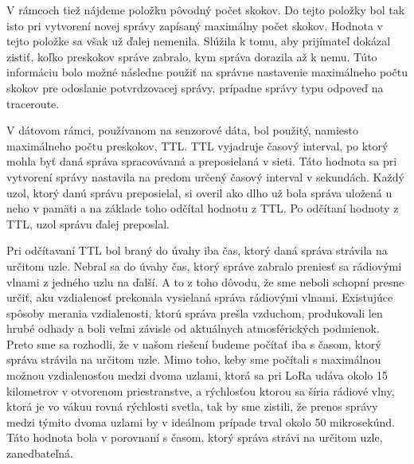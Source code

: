 \documentclass[slovak,master]{diploma}
\begin{document}
V rámcoch tiež nájdeme položku pôvodný počet skokov. Do tejto položky bol tak isto pri vytvorení novej správy zapísaný maximálny počet skokov. Hodnota v tejto položke sa 
však už ďalej nemenila. Slúžila k tomu, aby prijímateľ dokázal zistiť, koľko preskokov správe zabralo, kym správa dorazila až k nemu. Túto informáciu bolo možné 
následne použiť na správne nastavenie maximálneho počtu skokov pre odoslanie potvrdzovacej správy, prípadne správy typu odpoveď na traceroute.

\begin{table}[h!]
  \centering
  \qquad
  \caption{Štruktúra dátového rámcu pre ACK a senzorové správy.}
  \label{tab:frames}
\end{table}

V dátovom rámci, používanom na senzorové dáta, bol použitý, namiesto maximálneho počtu preskokov, TTL. TTL vyjadruje časový interval, po ktorý mohla byť daná správa 
spracovávaná a preposielaná v sieti. Táto hodnota sa pri vytvorení správy nastavila na predom určený časový interval v sekundách. Každý uzol, ktorý danú správu preposielal, 
si overil ako dlho už bola správa uložená u neho v pamäti a na základe toho odčítal hodnotu z TTL. Po odčítaní hodnoty z TTL, uzol správu ďalej preposlal.

Pri odčítavaní TTL bol braný do úvahy iba čas, ktorý daná správa strávila na určitom uzle. Nebral sa do úvahy čas, ktorý správe zabralo preniesť sa rádiovými vlnami z jedného uzlu 
na ďalší. A to z toho dôvodu, že sme neboli schopní presne určiť, aku vzdialenosť prekonala vysielaná správa rádiovými vlnami. Existujúce spôsoby merania vzdialenosti, 
ktorú správa prešla vzduchom, produkovali len hrubé odhady a boli veľmi závisle od aktuálnych atmosférických podmienok. Preto sme sa rozhodli, že v našom riešení budeme 
počítať iba s časom, ktorý správa strávila na určitom uzle. Mimo toho, keby sme počítali s maximálnou možnou vzdialenosťou medzi dvoma uzlami, ktorá sa pri LoRa 
udáva okolo 15 kilometrov v otvorenom priestranstve, a rýchlosťou ktorou sa šíria rádiové vlny, ktorá je vo vákuu rovná rýchlosti svetla, tak by sme zistili, 
že prenos správy medzi týmito dvoma uzlami by v ideálnom prípade trval okolo 50 mikrosekúnd. Táto hodnota bola v porovnaní s časom, ktorý správa strávi na určitom uzle, 
zanedbateľná. %
\end{document}
